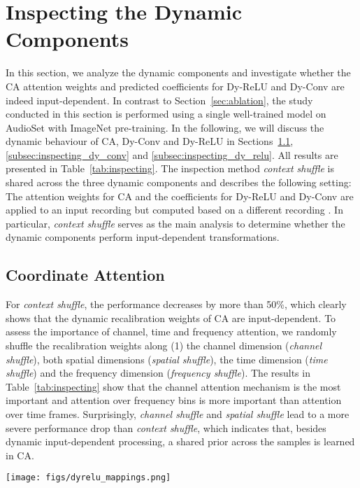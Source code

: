 \documentclass[lettersize,journal]{IEEEtran}
\begin{document}
\section{Inspecting the Dynamic Components}
\label{sec:inspecting}

In this section, we analyze the dynamic components and investigate whether the CA attention weights and predicted coefficients for Dy-ReLU and Dy-Conv are indeed input-dependent. In contrast to Section~\ref{sec:ablation}, the study conducted in this section is performed using a single well-trained model on AudioSet
with ImageNet
pre-training. In the following, we will discuss the dynamic behaviour of CA, Dy-Conv and Dy-ReLU in Sections~\ref{subsec:inspecting_ca}, \ref{subsec:inspecting_dy_conv} and \ref{subsec:inspecting_dy_relu}. All results are presented in Table~\ref{tab:inspecting}. The inspection method \textit{context shuffle} is shared across the three dynamic components and describes the following setting: The attention weights for CA and the coefficients for Dy-ReLU and Dy-Conv are applied to an input recording  but computed based on a different recording . In particular, \textit{context shuffle} serves as the main analysis to determine whether the dynamic components perform input-dependent transformations.

\subsection{Coordinate Attention}
\label{subsec:inspecting_ca}

For \textit{context shuffle}, the performance decreases by more than 50\%, which clearly shows that the dynamic recalibration weights of CA are input-dependent. To assess the importance of channel, time and frequency attention, we randomly shuffle the recalibration weights along (1) the channel dimension (\textit{channel shuffle}), both spatial dimensions (\textit{spatial shuffle}), the time dimension (\textit{time shuffle}) and the frequency dimension (\textit{frequency shuffle}). The results in Table~\ref{tab:inspecting} show that the channel attention mechanism is the most important and attention over frequency bins is more important than attention over time frames. Surprisingly, \textit{channel shuffle} and \textit{spatial shuffle} lead to a more severe performance drop than \textit{context shuffle}, which indicates that, besides dynamic input-dependent processing, a shared prior across the samples is learned in CA.

\begin{figure*}[t]
\centering
{\texttt{[image: figs/dyrelu\_mappings.png]}}
\caption{The figure shows the input to output mapping of Dy-ReLU for blocks at different depths in a well-trained DyMN-M. To generate the plots we use 10,000 randomly selected samples from the AudioSet evaluation set. Block 1 corresponds to the first block and Block 15 corresponds to the final block in Dy-MN. The dashed red line depicts the conventional ReLU function.}\label{fig:dyrelu_mapping}\end{figure*}
\end{document}
